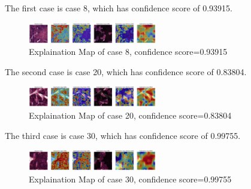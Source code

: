 \documentclass[conference]{IEEEtran}
\begin{document}

The first case is case 8, which has confidence score of 0.93915.
\begin{figure}[h] 
    \centering
    \includegraphics[width=0.5\textwidth]{./pics/HMT/Tumor-Tumor-0.93915-output-8.png}
    \caption{Explaination Map of case 8, confidence score=0.93915} 
\end{figure}
The second case is case 20, which has confidence score of 0.83804.

\begin{figure}[h] 
    \centering
    \includegraphics[width=0.5\textwidth]{./pics/HMT/Tumor-Tumor-0.83804-output-20.png}
    \caption{Explaination Map of case 20, confidence score=0.83804} 
\end{figure}

The third case is case 30, which has confidence score of 0.99755.

\begin{figure}[h] 
    \centering
    \includegraphics[width=0.5\textwidth]{./pics/HMT/Tumor-Tumor-0.99755-output30.png}
    \caption{Explaination Map of case 30, confidence score=0.99755} 
\end{figure}
\end{document}
